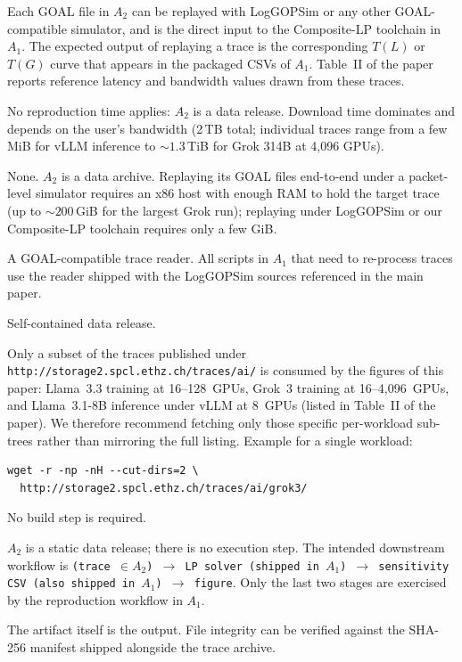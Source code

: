 \documentclass[conference]{IEEEtran}
\begin{document}
\artexp

Each GOAL file in $A_2$ can be replayed with LogGOPSim or any other
GOAL-compatible simulator, and is the direct input to the
Composite-LP toolchain in $A_1$. The expected output of replaying a
trace is the corresponding $T(L)$ or $T(G)$ curve that appears in
the packaged CSVs of $A_1$. Table~II of the paper reports reference
latency and bandwidth values drawn from these traces.

\arttime

No reproduction time applies: $A_2$ is a data release. Download
time dominates and depends on the user's bandwidth (2\,TB total;
individual traces range from a few MiB for vLLM inference to
${\sim}1.3$\,TiB for Grok 314B at 4{,}096 GPUs).

\artin


None. $A_2$ is a data archive. Replaying its GOAL files end-to-end
under a packet-level simulator requires an x86 host with enough RAM
to hold the target trace (up to ${\sim}200$\,GiB for the largest
Grok run); replaying under LogGOPSim or our Composite-LP toolchain
requires only a few GiB.


A GOAL-compatible trace reader. All scripts in $A_1$ that need to
re-process traces use the reader shipped with the LogGOPSim sources
referenced in the main paper.


Self-contained data release.


Only a subset of the traces published under
\texttt{http://storage2.spcl.ethz.ch/\allowbreak traces/ai/}
is consumed by the figures of this paper: Llama~3.3 training
at 16--128~GPUs, Grok~3 training at 16--4{,}096~GPUs, and Llama~3.1-8B
inference under vLLM at 8~GPUs (listed in Table~II of the
paper). We therefore recommend fetching only those specific
per-workload sub-trees rather than mirroring the full listing.
Example for a single workload:

\begingroup\small
\begin{verbatim}
wget -r -np -nH --cut-dirs=2 \
  http://storage2.spcl.ethz.ch/traces/ai/grok3/
\end{verbatim}
\endgroup

No build step is required.

\artcomp

$A_2$ is a static data release; there is no execution step. The
intended downstream workflow is \texttt{(trace $\in A_2$) $\to$ LP
solver (shipped in $A_1$) $\to$ sensitivity CSV (also shipped in
$A_1$) $\to$ figure}. Only the last two stages are exercised by the
reproduction workflow in $A_1$.

\artout

The artifact itself is the output. File integrity can be verified
against the SHA-256 manifest shipped alongside the trace archive.
\end{document}
